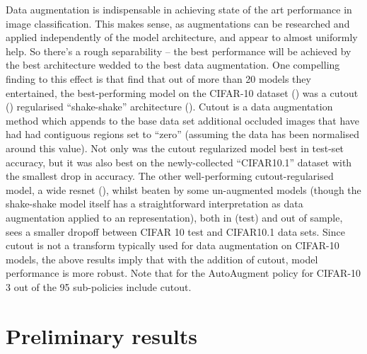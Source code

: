 \documentclass[10pt,twocolumn,letterpaper]{article}
\begin{document}
	Data augmentation is indispensable in achieving state of the art performance in image classification. This makes  sense, as augmentations can be researched and applied independently of the model architecture, and appear to almost uniformly help. So there's a rough separability -- the best performance will be achieved by the best architecture wedded to the best data augmentation.  One compelling finding to this effect is that \cite{Recht2018} find that out of more than 20 models they entertained, the best-performing model on the CIFAR-10 dataset (\cite{Krizhevsk2009}) was a cutout (\cite{Devries2017}) regularised ``shake-shake'' architecture (\cite{Gastaldi2017}). Cutout is a data augmentation method which appends to the base data set additional occluded images that have had had contiguous regions set to ``zero'' (assuming the data has been normalised around this value). 
	Not only was the cutout regularized model best in test-set accuracy, but it was also best on the newly-collected ``CIFAR10.1'' dataset with the smallest drop in accuracy. The other well-performing cutout-regularised model, a wide resnet (\cite{Zagoruyko2016}), whilst beaten by some un-augmented models (though the shake-shake model itself has a straightforward interpretation as data augmentation applied to an representation), both in (test) and out of sample, sees a smaller dropoff between CIFAR 10 test and CIFAR10.1 data sets. Since cutout is not a transform typically used for data augmentation on CIFAR-10 models, the above results imply that with the addition of cutout, model performance is more robust. Note that for the AutoAugment policy for CIFAR-10 3 out of the 95 sub-policies include cutout.



\section{Preliminary results}
\end{document}
